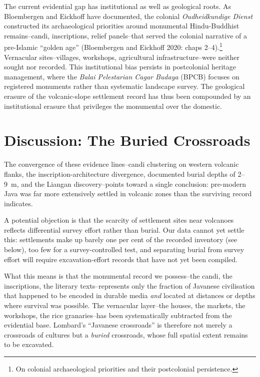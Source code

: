\documentclass[12pt,a4paper]{article}
\begin{document}
The current evidential gap has institutional as well as geological roots.
As Bloembergen and Eickhoff have documented, the colonial \emph{Oudheidkundige Dienst} constructed its archaeological priorities around monumental Hindu-Buddhist remains--candi, inscriptions, relief panels--that served the colonial narrative of a pre-Islamic ``golden age'' (Bloembergen and Eickhoff 2020: chaps 2--4).\footnote{On colonial archaeological priorities and their postcolonial persistence.}
Vernacular sites--villages, workshops, agricultural infrastructure--were neither sought nor recorded.
This institutional bias persists in postcolonial heritage management, where the \emph{Balai Pelestarian Cagar Budaya} (BPCB) focuses on registered monuments rather than systematic landscape survey.
The geological erasure of the volcanic-slope settlement record has thus been compounded by an institutional erasure that privileges the monumental over the domestic.


\section{Discussion: The Buried Crossroads}

The convergence of these evidence lines--candi clustering on western volcanic flanks, the inscription-architecture divergence, documented burial depths of 2--9~m, and the Liangan discovery--points toward a single conclusion: pre-modern Java was far more extensively settled in volcanic zones than the surviving record indicates.

A potential objection is that the scarcity of settlement sites near volcanoes reflects differential survey effort rather than burial.
Our data cannot yet settle this: settlements make up barely one per cent of the recorded inventory (see below), too few for a survey-controlled test, and separating burial from survey effort will require excavation-effort records that have not yet been compiled.

What this means is that the monumental record we possess--the candi, the inscriptions, the literary texts--represents only the fraction of Javanese civilisation that happened to be encoded in durable media \emph{and} located at distances or depths where survival was possible.
The vernacular layer--the houses, the markets, the workshops, the rice granaries--has been systematically subtracted from the evidential base.
Lombard's ``Javanese crossroads'' is therefore not merely a crossroads of cultures but a \emph{buried} crossroads, whose full spatial extent remains to be excavated.
\end{document}
